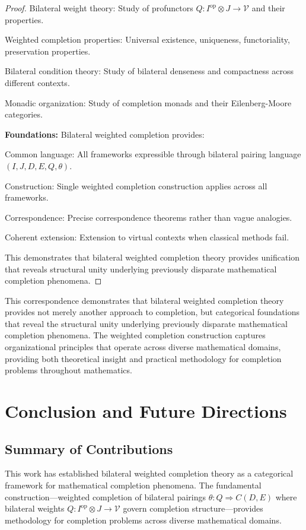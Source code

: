 \documentclass[11pt]{article}
\theoremstyle{plain}
\theoremstyle{definition}
\theoremstyle{remark}
\newcommand{\V}{\mathcal{V}}
\newcommand{\op}{\mathrm{op}}
\begin{document}
\begin{proof}
Bilateral weight theory: Study of profunctors $Q : I^{\op} \otimes J \to \V$ and their properties.

Weighted completion properties: Universal existence, uniqueness, functoriality, preservation properties.

Bilateral condition theory: Study of bilateral denseness and compactness across different contexts.

Monadic organization: Study of completion monads and their Eilenberg-Moore categories.

\textbf{Foundations:} Bilateral weighted completion provides:

Common language: All frameworks expressible through bilateral pairing language $(I, J, D, E, Q, \theta)$.

Construction: Single weighted completion construction applies across all frameworks.

Correspondence: Precise correspondence theorems rather than vague analogies.

Coherent extension: Extension to virtual contexts when classical methods fail.

This demonstrates that bilateral weighted completion theory provides unification that reveals structural unity underlying previously disparate mathematical completion phenomena.
\end{proof}

This correspondence demonstrates that bilateral weighted completion theory provides not merely another approach to completion, but categorical foundations that reveal the structural unity underlying previously disparate mathematical completion phenomena. The weighted completion construction captures organizational principles that operate across diverse mathematical domains, providing both theoretical insight and practical methodology for completion problems throughout mathematics.

\section{Conclusion and Future Directions}

\subsection{Summary of Contributions}

This work has established bilateral weighted completion theory as a categorical framework for mathematical completion phenomena. The fundamental construction---weighted completion of bilateral pairings $\theta : Q \Rightarrow C(D,E)$ where bilateral weights $Q : I^{\op} \otimes J \to \V$ govern completion structure---provides methodology for completion problems across diverse mathematical domains.
\end{document}
